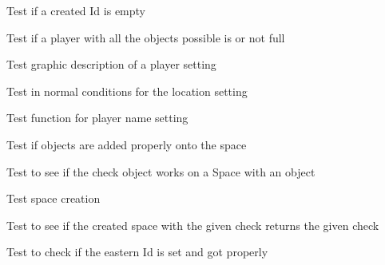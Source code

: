 \begin{DoxyRefList}
\item[\label{test__test000194}%
\hypertarget{test__test000194}{}%
Member \hyperlink{player__test_8h_a9e7594fd2a1016abea94e0b88016d6ec}{test1\+\_\+player\+\_\+is\+\_\+empty} ()]Test if a created Id is empty  
\item[\label{test__test000197}%
\hypertarget{test__test000197}{}%
Member \hyperlink{player__test_8h_a2c7a96147ce996da70dce4b4cb37ecef}{test1\+\_\+player\+\_\+is\+\_\+full} ()]Test if a player with all the objects possible is or not full  
\item[\label{test__test000169}%
\hypertarget{test__test000169}{}%
Member \hyperlink{player__test_8h_adfd8f1d4fd7d500f9b5236db4e697ea3}{test1\+\_\+player\+\_\+set\+\_\+graphic\+\_\+description} ()]Test graphic description of a player setting  
\item[\label{test__test000172}%
\hypertarget{test__test000172}{}%
Member \hyperlink{player__test_8h_aec6799a4f46c3f3c471fcb668addcad4}{test1\+\_\+player\+\_\+set\+\_\+location} ()]Test in normal conditions for the location setting  
\item[\label{test__test000166}%
\hypertarget{test__test000166}{}%
Member \hyperlink{player__test_8h_a9d87c09e6af910d695265e3fd77ae3a2}{test1\+\_\+player\+\_\+set\+\_\+name} ()]Test function for player name setting  
\item[\label{test__test000245}%
\hypertarget{test__test000245}{}%
Member \hyperlink{space__test_8h_afe51f379fb29f8e96f9f034df991de30}{test1\+\_\+space\+\_\+add\+\_\+object} ()]Test if objects are added properly onto the space  
\item[\label{test__test000254}%
\hypertarget{test__test000254}{}%
Member \hyperlink{space__test_8h_a6989d8b8621fd8374ae4c0109591943c}{test1\+\_\+space\+\_\+check\+\_\+object} ()]Test to see if the check object works on a Space with an object  
\item[\label{test__test000204}%
\hypertarget{test__test000204}{}%
Member \hyperlink{space__test_8h_a69278cc022dc5688d4725f8d36317b30}{test1\+\_\+space\+\_\+create} ()]Test space creation  
\item[\label{test__test000237}%
\hypertarget{test__test000237}{}%
Member \hyperlink{space__test_8h_aea5055c002d6150e36f79b3ebe48d07d}{test1\+\_\+space\+\_\+get\+\_\+check} ()]Test to see if the created space with the given check returns the given check  
\item[\label{test__test000231}%
\hypertarget{test__test000231}{}%
Member \hyperlink{space__test_8h_a354adb2722b06ec65b7212d2736d6417}{test1\+\_\+space\+\_\+get\+\_\+east} ()]Test to check if the eastern Id is set and got properly  

\end{DoxyRefList}
